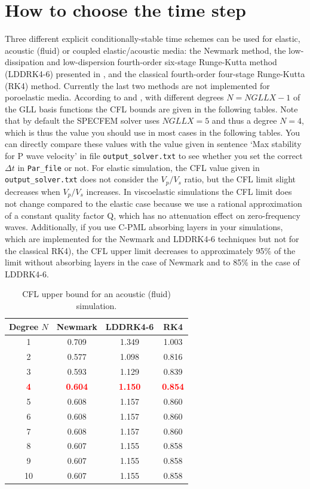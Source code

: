 \documentclass[oneside,english,onecolumn,letterpaper]{book}
\newcommand{\red}[1]{\textbf{\textcolor{Red}{#1}}}
\begin{document}
\section{How to choose the time step}

Three different explicit conditionally-stable time schemes can be used for elastic, acoustic (fluid) or coupled elastic/acoustic media:
the Newmark method, the low-dissipation and low-dispersion fourth-order six-stage Runge-Kutta method (LDDRK4-6) presented in \cite{BeBoBa06},
and the classical fourth-order four-stage Runge-Kutta (RK4) method.
Currently the last two methods are not implemented for poroelastic media.
According to \cite{DeSe10} and \cite{BeBoBa06}, with different degrees $N=NGLLX-1$ of the GLL basis functions the CFL bounds are given in the following tables.
Note that by default the SPECFEM solver uses $NGLLX = 5$ and thus a degree $N = 4$, which is thus the value you should use
in most cases in the following tables.
You can directly compare these values with the value given in sentence `Max stability for P wave velocity' in file
\texttt{output\_solver.txt} to see whether you set the correct $\Delta t$ in \texttt{Par\_file} or not.
For elastic simulation, the
CFL value given in \texttt{output\_solver.txt} does not consider the $V_p/V_s$ ratio, but the CFL limit slight decreases when $V_p/V_s$ increases.
In viscoelastic simulations the CFL limit does not change compared to the elastic case because we use a rational approximation of a constant quality factor Q, which has no attenuation effect on zero-frequency waves.
Additionally, if you use C-PML absorbing layers in your simulations, which are implemented for the Newmark and LDDRK4-6 techniques but not for the classical RK4), the CFL upper limit decreases to approximately 95\% of the limit without absorbing layers in the case of Newmark and to 85\% in the case of LDDRK4-6.
\begin{table}[ht]
\caption{CFL upper bound for an acoustic (fluid) simulation.}
\centering
\begin{tabular}{c c c c}
\hline\hline
Degree $N$ & Newmark & LDDRK4-6 & RK4 \\ [0.5ex]
\hline
1 & 0.709 & 1.349 & 1.003 \\
2 & 0.577 & 1.098 & 0.816 \\
3 & 0.593 & 1.129 & 0.839 \\
\red{4} & \red{0.604} & \red{1.150} & \red{0.854} \\
5 & 0.608 & 1.157 & 0.860 \\
6 & 0.608 & 1.157 & 0.860 \\
7 & 0.608 & 1.157 & 0.860 \\
8 & 0.607 & 1.155 & 0.858 \\
9 & 0.607 & 1.155 & 0.858 \\
10 & 0.607 & 1.155 & 0.858 \\ [1ex]
\hline
\end{tabular}
\label{table:CFLacoustic}
\end{table}
\end{document}

